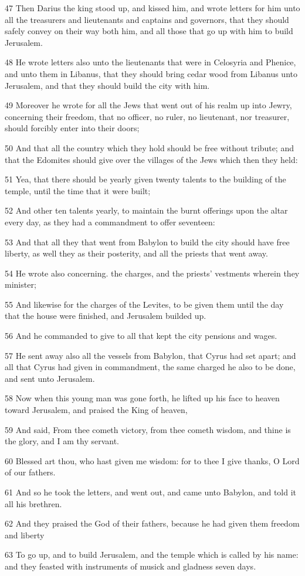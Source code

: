 \par 47 Then Darius the king stood up, and kissed him, and wrote letters for him unto all the treasurers and lieutenants and captains and governors, that they should safely convey on their way both him, and all those that go up with him to build Jerusalem.
\par 48 He wrote letters also unto the lieutenants that were in Celosyria and Phenice, and unto them in Libanus, that they should bring cedar wood from Libanus unto Jerusalem, and that they should build the city with him.
\par 49 Moreover he wrote for all the Jews that went out of his realm up into Jewry, concerning their freedom, that no officer, no ruler, no lieutenant, nor treasurer, should forcibly enter into their doors;
\par 50 And that all the country which they hold should be free without tribute; and that the Edomites should give over the villages of the Jews which then they held:
\par 51 Yea, that there should be yearly given twenty talents to the building of the temple, until the time that it were built;
\par 52 And other ten talents yearly, to maintain the burnt offerings upon the altar every day, as they had a commandment to offer seventeen:
\par 53 And that all they that went from Babylon to build the city should have free liberty, as well they as their posterity, and all the priests that went away.
\par 54 He wrote also concerning. the charges, and the priests' vestments wherein they minister;
\par 55 And likewise for the charges of the Levites, to be given them until the day that the house were finished, and Jerusalem builded up.
\par 56 And he commanded to give to all that kept the city pensions and wages.
\par 57 He sent away also all the vessels from Babylon, that Cyrus had set apart; and all that Cyrus had given in commandment, the same charged he also to be done, and sent unto Jerusalem.
\par 58 Now when this young man was gone forth, he lifted up his face to heaven toward Jerusalem, and praised the King of heaven,
\par 59 And said, From thee cometh victory, from thee cometh wisdom, and thine is the glory, and I am thy servant.
\par 60 Blessed art thou, who hast given me wisdom: for to thee I give thanks, O Lord of our fathers.
\par 61 And so he took the letters, and went out, and came unto Babylon, and told it all his brethren.
\par 62 And they praised the God of their fathers, because he had given them freedom and liberty
\par 63 To go up, and to build Jerusalem, and the temple which is called by his name: and they feasted with instruments of musick and gladness seven days.

